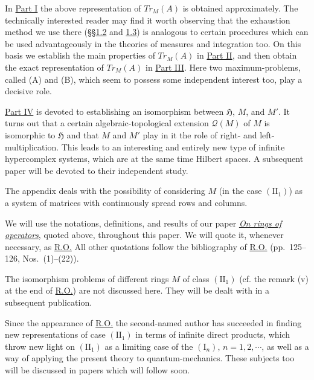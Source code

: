 \documentclass[twoside,leqno]{article}
\newcommand{\TrM}{Tr_M}
\newcommand{\cH}{\mathfrak{H}}
\newcommand{\Q}{\mathcal{Q}}
\newcommand{\RO}{\href{https://doi.org/10.2307/1968693}{R.O.}}
\begin{document}
In \hyperlink{chap:I}{Part I} the above representation of $\TrM(A)$ is obtained approximately.
The technically interested reader may find it worth observing that the exhaustion
method we use there (\hyperlink{sec:1.2}{\S\S1.2} and \hyperlink{sec:1.3}{1.3}) is analogous to certain procedures
which can be used advantageously in the theories of measures and integration too.
On this basis we establish the main properties of $\TrM(A)$ in \hyperlink{chap:II}{Part II},
and then obtain the exact representation of $\TrM(A)$ in \hyperlink{chap:III}{Part III}.
Here two maximum-problems, called (A) and (B), which seem to possess some
independent interest too, play a decisive role.

\hyperlink{chap:IV}{Part IV} is devoted to establishing an isomorphism between $\cH$, $M$, and $M'$.
It turns out that a certain algebraic-topological extension $\Q(M)$ of $M$ is
isomorphic to $\cH$ and that $M$ and $M'$ play in it the role of right- and
left-multiplication. This leads to an interesting and entirely new type of infinite
hypercomplex systems, which are at the same time Hilbert spaces. A subsequent
paper will be devoted to their independent study.

The appendix deals with the possibility of considering $M$ (in the case
$(\mathrm{II}_1)$) as a system of matrices with continuously spread rows and columns.

We will use the notations, definitions, and results of our paper
\href{https://doi.org/10.2307/1968693}{\textit{On rings of operators}}, quoted
above, throughout this paper. We will quote it, whenever
necessary, as \RO{} All other quotations follow the bibliography of \RO{}
(pp.~125--126, Nos.~(1)--(22)).

The isomorphism problems of different rings $M$ of class $(\mathrm{II}_1)$ (cf. the
remark (v) at the end of \RO{}) are not discussed here. They will be dealt with
in a subsequent publication.

Since the appearance of \RO{} the second-named author has succeeded in
finding new representations of case $(\mathrm{II}_1)$ in terms of infinite direct products,
which throw new light on $(\mathrm{II}_1)$ as a limiting case of the $(\mathrm I_n)$, $n=1,2,\cdots$,
as well as a way of applying the present theory to quantum-mechanics. These
subjects too will be discussed in papers which will follow soon.
\end{document}
